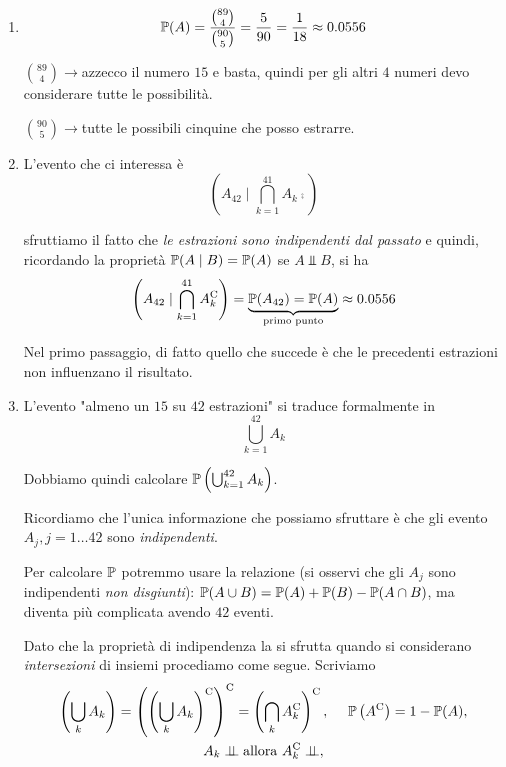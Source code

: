 \begin{enumerate}
\item \begin{equation*}
\mathbb{P}( A) =\frac{\binom{89}{4}}{\binom{90}{5}} =\frac{5}{90} =\frac{1}{18} \approx 0.0556
\end{equation*}

$\binom{89}{4}\rightarrow $azzecco il numero $15$ e basta, quindi per gli altri $4$ numeri devo considerare tutte le possibilità.

$\binom{90}{5}\rightarrow $tutte le possibili cinquine che posso estrarre.
\item L'evento che ci interessa è\begin{equation*}
\left( A_{42} \mid \bigcap _{k=1}^{41} A_{k}\comp\right)
\end{equation*}

sfruttiamo il fatto che \textit{le estrazioni sono indipendenti dal passato} e quindi, ricordando la proprietà $\mathbb{P}( A\mid B) =\mathbb{P}( A)$ se $A\Bot B$, si ha
\begin{equation*}
\left( A_{42} \mid\bigcap _{k=1}^{41} A_{k}^{\mathrm{C}}\right) =\underbrace{\mathbb{P}( A_{42}) =\mathbb{P}( A)}_{\text{primo punto}} \approx 0.0556
\end{equation*}

Nel primo passaggio, di fatto quello che succede è che le precedenti estrazioni non influenzano il risultato.
\item L'evento "almeno un $15$ su $42$ estrazioni" si traduce formalmente in
\begin{equation*}
\bigcup _{k=1}^{42} A_{k}
\end{equation*}

Dobbiamo quindi calcolare $\mathbb{P}\left(\bigcup _{k=1}^{42} A_{k}\right)$.

Ricordiamo che l'unica informazione che possiamo sfruttare è che gli evento $A_{j} ,j=1\dots 42$ sono \textit{indipendenti}.

Per calcolare $\mathbb{P}$ potremmo usare la relazione (si osservi che gli $A_{j}$ sono indipendenti \textit{non disgiunti}): $\mathbb{P}( A\cup B) =\mathbb{P}( A) +\mathbb{P}( B) -\mathbb{P}( A\cap B)$, ma diventa più complicata avendo $42$ eventi.

Dato che la proprietà di indipendenza la si sfrutta quando si considerano \textit{intersezioni} di insiemi procediamo come segue. Scriviamo
\begin{gather*}
\left(\bigcup _{k} A_{k}\right) =\left(\left(\bigcup _{k} A_{k}\right)^{\mathrm{C}}\right)^{\mathrm{C}} =\left(\bigcap _{k} A_{k}^{\mathrm{C}}\right)^{\mathrm{C}} ,\ \ \ \ \mathbb{P}\left( A^{\mathrm{C}}\right) =1-\mathbb{P}( A) ,\\
A_{k} \perp \!\!\! \perp \text{allora} \ A_{k}^{\mathrm{C}} \perp \!\!\! \perp ,
\end{gather*}


\end{enumerate}
